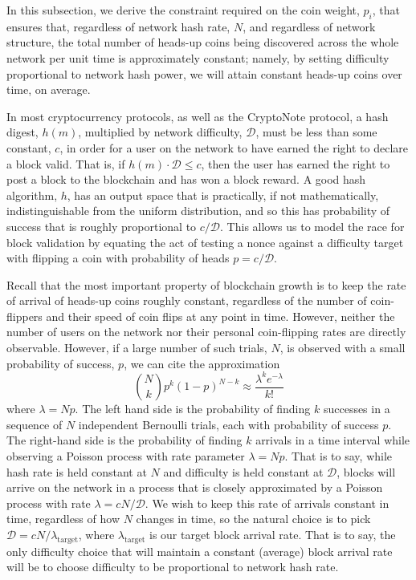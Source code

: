 \documentclass[12pt,english]{mrl}
\theoremstyle{definition}
\renewcommand{\leq}{\leqslant}
\numberwithin{equation}{section}
\numberwithin{figure}{section}
\numberwithin{equation}{section}
\numberwithin{equation}{section}
\numberwithin{figure}{section}
\begin{document}
In this subsection, we derive the constraint required on the coin weight, $p_i$, that ensures that, regardless of network hash rate, $N$, and regardless of network structure, the total number of heads-up coins being discovered across the whole network per unit time is approximately constant; namely, by setting difficulty proportional to network hash power, we will attain constant heads-up coins over time, on average. 

In most cryptocurrency protocols, as well as the CryptoNote protocol, a hash digest, $h(m)$, multiplied by network difficulty, $\mathcal{D}$, must be less than some constant, $c$, in order for a user on the network to have earned the right to declare a block valid. That is, if $h(m)\cdot\mathcal{D} \leq c$, then the user has earned the right to post a block to the blockchain and has won a block reward. A good hash algorithm, $h$, has an output space that is practically, if not mathematically, indistinguishable from the uniform distribution, and so this has probability of success that is roughly proportional to $c/\mathcal{D}$. This allows us to model the race for block validation by equating the act of testing a nonce against a difficulty target with flipping a coin with probability of heads $p=c/\mathcal{D}$. 

Recall that the most important property of blockchain growth is to keep the rate of arrival of heads-up coins roughly constant, regardless of the number of coin-flippers and their speed of coin flips at any point in time. However, neither the number of users on the network nor their personal coin-flipping rates are directly observable. However, if a large number of such trials, $N$, is observed with a small probability of success, $p$, we can cite the approximation
\[\binom{N}{k} p^k(1-p)^{N-k} \approx \frac{\lambda^k e^{-\lambda}}{k!}\]
where $\lambda = Np$. The left hand side is the probability of finding $k$ successes in a sequence of $N$ independent Bernoulli trials, each with probability of success $p$. The right-hand side is the probability of finding $k$ arrivals in a time interval while observing a Poisson process with rate parameter $\lambda = Np$. That is to say, while hash rate is held constant at $N$ and difficulty is held constant at $\mathcal{D}$, blocks will arrive on the network in a process that is closely approximated by a Poisson process with rate $\lambda = cN/\mathcal{D}$. We wish to keep this rate of arrivals constant in time, regardless of how $N$ changes in time, so the natural choice is to pick $\mathcal{D} = cN/\lambda_{\text{target}}$, where $\lambda_{\text{target}}$ is our target block arrival rate. That is to say, the only difficulty choice that will maintain a constant (average) block arrival rate will be to choose difficulty to be proportional to network hash rate.
\end{document}
